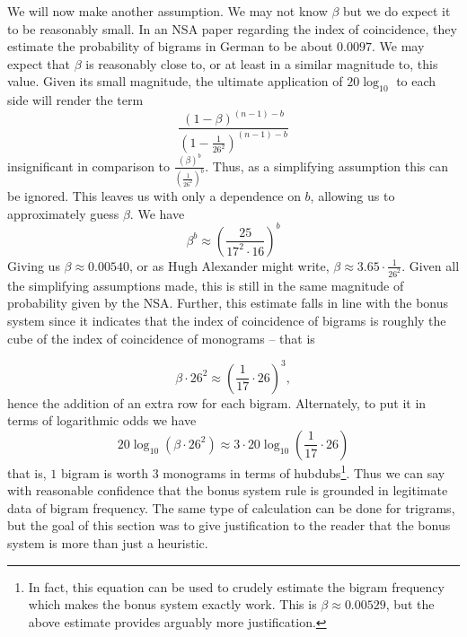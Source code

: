 
\noindent We will now make another assumption. We may not know
$\beta$ but we do expect it to be reasonably small. In an NSA paper
regarding the index of coincidence, they estimate the probability of
bigrams in German to be about $0.0097$. We may expect that $\beta$ is
reasonably close to, or at least in a similar magnitude to, this value.
Given its small magnitude, the ultimate application of
$20\log_{10}$ to each side will render the term
\[
  \frac{(1-\beta)^{(n-1)-b}}{(1-\frac{1}{26^2})^{(n-1)-b}}
\]
insignificant in comparison to
$\frac{(\beta)^b}{(\frac{1}{26^2})^b}$. Thus, as a simplifying
assumption this can be ignored.
This leaves us with only a dependence on $b$, allowing us to
approximately guess $\beta$. We have
\[
  \beta^b \approx
  (\frac{25}{17^2\cdot16})^b
\]
Giving us $\beta \approx 0.00540$, or as Hugh Alexander might
write, $\beta \approx 3.65\cdot\frac{1}{26^2}$. Given all the
simplifying assumptions made, this is still in the same magnitude
of probability given by the NSA. Further, this estimate falls in
line with the bonus system since it indicates that the index of
coincidence of bigrams is roughly the cube of the index of
coincidence of monograms -- that is

\[
  \beta\cdot26^2 \approx (\frac{1}{17}\cdot26)^3,
\]
hence the addition of an extra row for each bigram. Alternately, to
put it in terms of
logarithmic odds we have
\[
  20\log_{10}(\beta\cdot26^2) \approx 3\cdot20\log_{10}(\frac{1}{17}\cdot26)
\]
that is, $1$ bigram is worth $3$ monograms in terms of
hubdubs\footnote{In fact, this equation can be used to crudely
  estimate the bigram frequency which makes the bonus system exactly
  work. This is $\beta\approx0.00529$, but the above estimate
provides arguably more justification.}. Thus we can say with reasonable
confidence that the bonus system rule is grounded in legitimate
data of bigram frequency. The same type of calculation can be done
for trigrams, but the goal of this section was to give justification
to the reader that the bonus system is more than just a heuristic.

